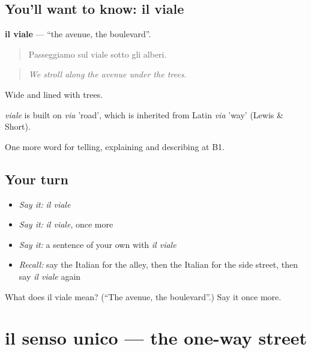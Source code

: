 \subsection*{You'll want to know: il viale}
\textbf{il viale} — \textquotedblleft{}the avenue, the boulevard\textquotedblright{}.

\begin{quote}
Passeggiamo sul viale sotto gli alberi.
\end{quote}

\begin{quote}
\emph{We stroll along the avenue under the trees.}
\end{quote}

Wide and lined with trees.

\begin{cousinweb}
\emph{viale} is built on \emph{via} 'road', which is inherited from Latin \emph{via} 'way' (Lewis \& Short).
\end{cousinweb}

\begin{grammarlens}[title={What you've built}]
One more word for telling, explaining and describing at B1.
\end{grammarlens}

\subsection*{Your turn}
\begin{itemize}
\raggedright
  \item \emph{Say it:} \emph{il viale}
  \item \emph{Say it:} \emph{il viale}, once more
  \item \emph{Say it:} a sentence of your own with \emph{il viale}
  \item \emph{Recall:} say the Italian for the alley, then the Italian for the side street, then say \emph{il viale} again
\end{itemize}

\begin{tcolorbox}[breakable,colback=teal!4,colframe=teal!35!black,title={Before you move on}]
What does il viale mean? (\textquotedblleft{}The avenue, the boulevard\textquotedblright{}.) Say it once more.
\end{tcolorbox}
\section[il senso unico]{il senso unico — the one-way street}

